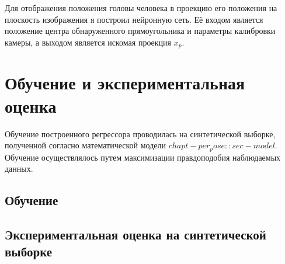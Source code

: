Для отображения положения головы человека в проекцию его положения на плоскость изображения я построил нейронную сеть. Её входом является положение центра обнаруженного прямоугольника и параметры калибровки камеры, а выходом является искомая проекция $x_p$.

\section{Обучение и экспериментальная оценка}

Обучение построенного регрессора проводилась на синтетической выборке, полученной согласно математической модели $chapt-per_pose::sec-model$.
Обучение осуществлялось путем максимизации правдоподобия наблюдаемых данных.

\subsection{Обучение}


\subsection{Экспериментальная оценка на синтетической выборке}
